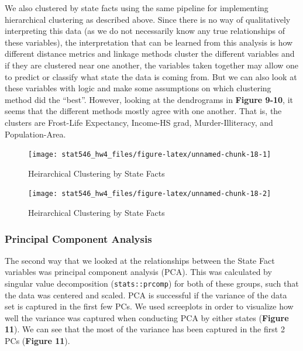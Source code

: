\documentclass[]{article}
\begin{document}
We also clustered by state facts using the same pipeline for
implementing hierarchical clustering as described above. Since there is
no way of qualitatively interpreting this data (as we do not necessarily
know any true relationships of these variables), the interpretation that
can be learned from this analysis is how different distance metrics and
linkage methods cluster the different variables and if they are
clustered near one another, the variables taken together may allow one
to predict or classify what state the data is coming from. But we can
also look at these variables with logic and make some assumptions on
which clustering method did the ``best''. However, looking at the
dendrograms in \textbf{Figure 9-10}, it seems that the different methods
mostly agree with one another. That is, the clusters are Frost-Life
Expectancy, Income-HS grad, Murder-Illiteracy, and Population-Area.

\begin{figure}[h]

{\centering \texttt{[image: stat546\_hw4\_files/figure-latex/unnamed-chunk-18-1]} 

}

\caption{Heirarchical Clustering by State Facts}\label{fig:unnamed-chunk-181}
\end{figure}\begin{figure}[h]

{\centering \texttt{[image: stat546\_hw4\_files/figure-latex/unnamed-chunk-18-2]} 

}

\caption{Heirarchical Clustering by State Facts}\label{fig:unnamed-chunk-182}
\end{figure}

\subsubsection{Principal Component
Analysis}\label{principal-component-analysis}

The second way that we looked at the relationships between the State
Fact variables was principal component analysis (PCA). This was
calculated by singular value decomposition (\texttt{stats::prcomp}) for
both of these groups, such that the data was centered and scaled. PCA is
successful if the variance of the data set is captured in the first few
PCs. We used screeplots in order to visualize how well the variance was
captured when conducting PCA by either states (\textbf{Figure 11}). We
can see that the most of the variance has been captured in the first 2
PCs (\textbf{Figure 11}).
\end{document}

